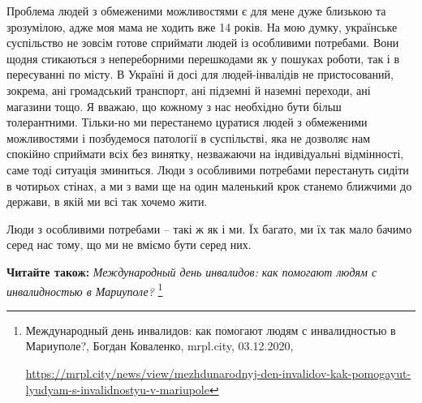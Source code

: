 Проблема людей з обмеженими можливостями є для мене дуже близькою та
зрозумілою, адже моя мама не ходить вже 14 років. На мою думку, українське
суспільство не зовсім готове сприймати людей із особливими потребами. Вони
щодня стикаються з непереборними перешкодами як у пошуках роботи, так і в
пересуванні по місту. В Україні й досі для людей-інвалідів не пристосований,
зокрема, ані громадський транспорт, ані підземні й наземні переходи, ані
магазини тощо. Я вважаю, що кожному з нас необхідно бути більш толерантними.
Тільки-но ми перестанемо цуратися людей з обмеженими можливостями і позбудемося
патології в суспільстві, яка не дозволяє нам спокійно сприймати всіх без
винятку, незважаючи на індивідуальні відмінності, саме тоді ситуація зминиться.
Люди з особливими потребами перестануть сидіти в чотирьох стінах, а ми з вами
ще на один маленький крок станемо ближчими до держави, в якій ми всі так хочемо
жити.

Люди з особливими потребами – такі ж як і ми. Їх багато, ми їх так мало бачимо
серед нас тому, що ми не вміємо бути серед них.

\textbf{Читайте також:} \emph{Международный день инвалидов: как помогают людям с инвалидностью в Мариуполе?}%
\footnote{Международный день инвалидов: как помогают людям с инвалидностью в Мариуполе?, Богдан Коваленко, mrpl.city, 03.12.2020, \par%
\url{https://mrpl.city/news/view/mezhdunarodnyj-den-invalidov-kak-pomogayut-lyudyam-s-invalidnostyu-v-mariupole}
}
